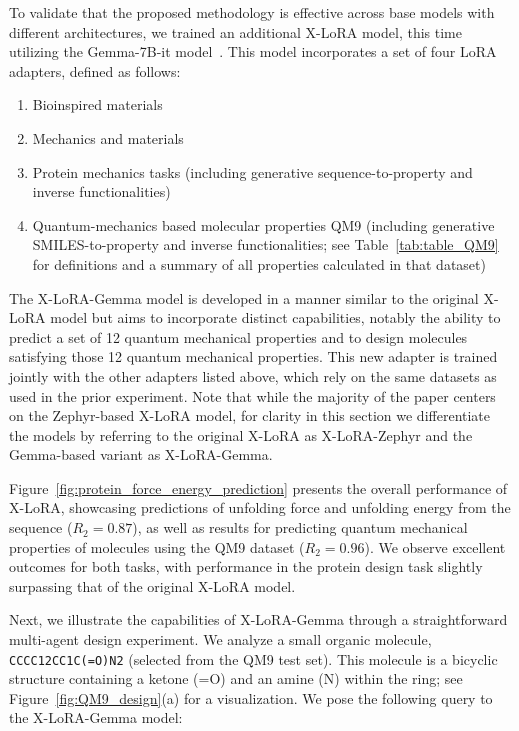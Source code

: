 To validate that the proposed methodology is effective across base models with different architectures, we trained an additional X-LoRA model, this time utilizing the Gemma-7B-it model~\cite{Google/gemma-7b-itFace}. This model incorporates a set of four LoRA adapters, defined as follows:

\begin{enumerate}
    \item Bioinspired materials \item Mechanics and materials \item Protein mechanics tasks (including generative sequence-to-property and inverse functionalities) \item Quantum-mechanics based molecular properties QM9 (including generative SMILES-to-property and inverse functionalities; see Table~\ref{tab:table_QM9} for definitions and a summary of all properties calculated in that dataset)~\cite{Ruddigkeit2012EnumerationGDB-17,Ramakrishnan2015ElectronicSpace}
\end{enumerate}

The X-LoRA-Gemma model is developed in a manner similar to the original X-LoRA model but aims to incorporate distinct capabilities, notably the ability to predict a set of 12 quantum mechanical properties and to design molecules satisfying those 12 quantum mechanical properties. This new adapter is trained jointly with the other adapters listed above, which rely on the same datasets as used in the prior experiment. Note that while the majority of the paper centers on the Zephyr-based X-LoRA model, for clarity in this section we differentiate the models by referring to the original X-LoRA as X-LoRA-Zephyr and the Gemma-based variant as X-LoRA-Gemma.

Figure~\ref{fig:protein_force_energy_prediction} presents the overall performance of X-LoRA, showcasing predictions of unfolding force and unfolding energy from the sequence ($R_2 = 0.87$), as well as results for predicting quantum mechanical properties of molecules using the QM9 dataset ($R_2 = 0.96$). We observe excellent outcomes for both tasks, with performance in the protein design task slightly surpassing that of the original X-LoRA model.

Next, we illustrate the capabilities of X-LoRA-Gemma through a straightforward multi-agent design experiment. We analyze a small organic molecule, \texttt{CCCC12CC1C(=O)N2} (selected from the QM9 test set). This molecule is a bicyclic structure containing a ketone (=O) and an amine (N) within the ring; see Figure~\ref{fig:QM9_design}(a) for a visualization. We pose the following query to the X-LoRA-Gemma model:

